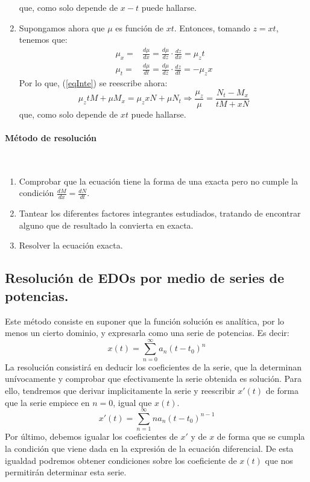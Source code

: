 \documentclass[11pt, a4paper,twoside]{article}
\theoremstyle{theorem-style}  %
\theoremstyle{definition-style}
\theoremstyle{example-style}
\begin{document}
\begin{enumerate}
	que, como solo depende de $x-t$ puede hallarse.
	\item Supongamos ahora que $\mu$ es función de $xt$. Entonces, tomando $z=xt$, tenemos que:
	\begin{align*}
	\mu_x = & \frac{d\mu}{dx} = \frac{d\mu}{dz} \cdot \frac{dz}{dx} = \mu_zt \\
	\mu_t = & \frac{d\mu}{dt} = \frac{d\mu}{dz} \cdot \frac{dz}{dt} = -\mu_zx 
	\end{align*}
	Por lo que, (\ref{eqInte}) se reescribe ahora:
	\[\mu_z tM + \mu M_x = \mu_z xN + \mu N_t \Rightarrow \frac{\mu_z}{\mu} = \frac{N_t - M_x}{tM + xN}\]
	que, como solo depende de $xt$ puede hallarse.
\end{enumerate}

\paragraph{Método de resolución} \ 
\begin{enumerate}
	\item Comprobar que la ecuación tiene la forma de una exacta pero no cumple la condición  $\frac{dM}{dx} = \frac{dN}{dt}$.
	\item Tantear los diferentes factores integrantes estudiados, tratando de encontrar alguno que de resultado la convierta en exacta.
	\item Resolver la ecuación exacta.
\end{enumerate}

\subsection{Resolución de EDOs por medio de series de potencias.}
Este método consiste en suponer que la función solución es analítica, por lo menos un cierto dominio, y expresarla como una serie de potencias. Es decir:
\[ x(t)= \sum\limits_{n=0}^{\infty} a_n(t-t_0)^n \]
La resolución consistirá en deducir los coeficientes de la serie, que la determinan unívocamente y comprobar que efectivamente la serie obtenida es solución.
Para ello, tendremos que derivar implicitamente la serie y reescribir $ x'(t) $ de forma que la serie empiece en $ n=0 $, igual que $ x(t) $. 
\[  x'(t)= \sum\limits_{n=1}^{\infty} na_n(t-t_0)^{n-1} \]
Por último, debemos igualar los coeficientes de $ x' $ y de $ x $ de forma que se cumpla la condición que viene dada en la expresión de la ecuación diferencial. De esta igualdad podremos obtener condiciones sobre los coeficiente de $ x(t) $ que nos permitirán determinar esta serie. 
\end{document}
